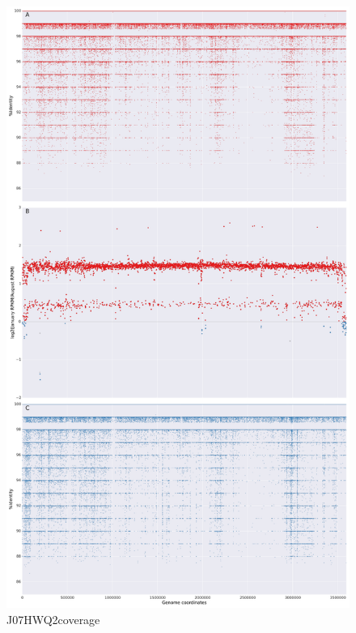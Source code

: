 \begin{figure}[!hbtp]
  \centering
  \includegraphics[width=\textwidth,height=\textheight,keepaspectratio]{Chapter5/Figures/coverage_plots/J07HWQ2_coverage.pdf}
  \caption{J07HWQ2coverage}
  \label{J07HWQ2coverage}
\end{figure}

